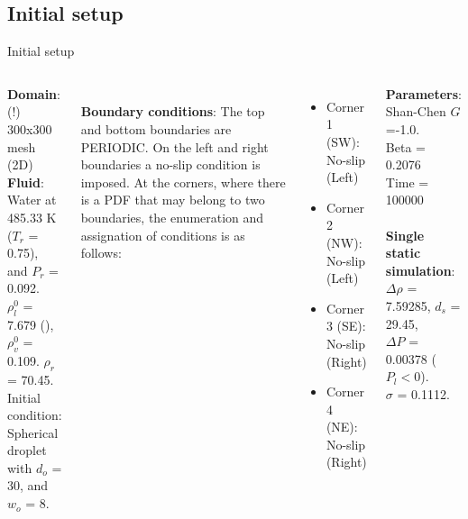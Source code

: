 \documentclass[8pt]{beamer}
\begin{document}
	\subsection*{Initial setup}
	\begin{frame}[t]{Initial setup}
		\justifying
		\begin{columns}[t]
			
			\textbf{Domain}: (!) 300x300 mesh (2D)\\
			\textbf{Fluid}: Water at 485.33 K ($T_r$ = 0.75), and $P_r$ = 0.092. \\$\rho_l^0$  = 7.679 (), $\rho_v^0$  = 0.109. $\rho_r$ = 70.45.\\
			Initial condition: Spherical droplet with $d_o$ = 30, and $w_o$ = 8.
			
			~\\
			\textbf{Boundary conditions}: The top and bottom boundaries are PERIODIC. On the left and right boundaries a no-slip condition is imposed. At the corners, where there is a PDF that may belong to two boundaries, the enumeration and assignation of conditions is as follows:
			\begin{itemize}
				\item Corner 1 (SW): No-slip (Left)
				\item Corner 2 (NW): No-slip (Left)
				\item Corner 3 (SE): No-slip (Right)
				\item Corner 4 (NE): No-slip (Right)
			\end{itemize}
		

			
			
			
			\textbf{Parameters}: Shan-Chen $G$=-1.0. \\
			Beta = 0.2076\\
			Time = 100000\\
			
			~\\
			\textbf{Single static simulation}:\\ $\Delta \rho $ = 7.59285, $d_s$ = 29.45, \\ $\Delta P$ = 0.00378 ($P_l < 0$). \\$\sigma$ = 0.1112.
		\end{columns}
	\end{frame}
\end{document}
